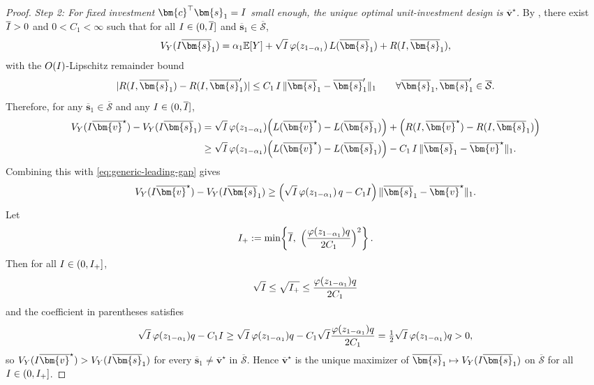 \begin{proof}
  \emph{Step 2: For fixed investment $\bm{c}^\top\bm{s}_1=\invst$ small enough, the unique optimal unit-investment design is $\overline{\bm{v}}^\star$.}
  By , there exist $\overline{I}>0$ and $0<C_1<\infty$ such that for all $I\in(0,\overline{I}]$ and $\overline{\bm{s}}_1\in\overline{\mathcal{S}}$,
  \[
    V_Y(\invst\overline{\bm{s}}_1)
    =\alpha_1
    \E[Y]+\sqrt{\invst}\,\varphi(z_{1-\alpha_1})\,L(\overline{\bm{s}}_1)+R(\invst,\overline{\bm{s}}_1),
  \]
  with the $O(I)$-Lipschitz remainder bound
  \[
    |R(\invst,\overline{\bm{s}}_1)-R(\invst,\overline{\bm{s}}_1')|
    \le C_1\,\invst\,\|\overline{\bm{s}}_1-\overline{\bm{s}}_1'\|_1
    \qquad\forall\overline{\bm{s}}_1,\overline{\bm{s}}_1'\in\overline{\mathcal{S}}.
  \]
  Therefore, for any $\overline{\bm{s}}_1\in\overline{\mathcal{S}}$ and any $I\in(0,\overline{I}]$,
  \begin{align*}
    V_Y(\invst\overline{\bm{v}}^\star)-V_Y(\invst\overline{\bm{s}}_1)
    &=
    \sqrt{\invst}\,\varphi(z_{1-\alpha_1})\Big(L(\overline{\bm{v}}^\star)-L(\overline{\bm{s}}_1)\Big)
    +\Big(R(\invst,\overline{\bm{v}}^\star)-R(\invst,\overline{\bm{s}}_1)\Big)\\
    &\ge
    \sqrt{\invst}\,\varphi(z_{1-\alpha_1})\Big(L(\overline{\bm{v}}^\star)-L(\overline{\bm{s}}_1)\Big)
    -C_1\,\invst\,\|\overline{\bm{s}}_1-\overline{\bm{v}}^\star\|_1.
  \end{align*}
  Combining this with \eqref{eq:generic-leading-gap} gives
  \[
    V_Y(\invst\overline{\bm{v}}^\star)-V_Y(\invst\overline{\bm{s}}_1)
    \ge
    \Big(\sqrt{\invst}\,\varphi(z_{1-\alpha_1})\,q-C_1
    \invst\Big)\,\|\overline{\bm{s}}_1-\overline{\bm{v}}^\star\|_1.
  \]
  Let
  \[
    \invst_+ \defeq
    \min\!\left\{\overline{\invst},\ \Big(\frac{\varphi(z_{1-\alpha_1})q}{2C_1}\Big)^2\right\}.
  \]
  Then for all $I\in(0,I_+]$,
  \[
    \sqrt{I} \le \sqrt{I_+}
    \le \frac{\varphi(z_{1-\alpha_1})q}{2C_1}
  \]
  and the coefficient in parentheses satisfies
  \[
    \sqrt{I}\,\varphi(z_{1-\alpha_1})q-C_1 I
    \ge
    \sqrt{I}\,\varphi(z_{1-\alpha_1})q-C_1 \sqrt{I}
    \frac{\varphi(z_{1-\alpha_1})q}{2C_1}
    =
    \tfrac{1}{2}\sqrt{I}\,\varphi(z_{1-\alpha_1})q>0,
  \]
  so $V_Y(\invst\overline{\bm{v}}^\star)>V_Y(\invst\overline{\bm{s}}_1)$ for every $\overline{\bm{s}}_1\neq \overline{\bm{v}}^\star$ in $\overline{\mathcal{S}}$.
  Hence $\overline{\bm{v}}^\star$ is the unique maximizer of $\overline{\bm{s}}_1\mapsto V_Y(\invst\overline{\bm{s}}_1)$ on $\overline{\mathcal{S}}$ for all $I\in(0,I_+]$.


\end{proof}
